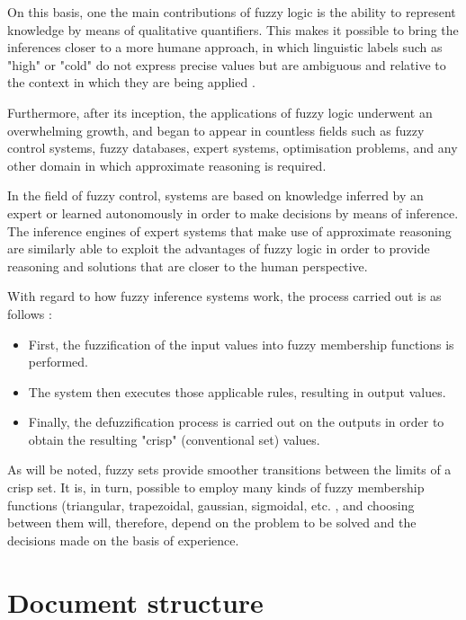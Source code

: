 On this basis, one the main contributions of fuzzy logic is the ability to represent knowledge by means of qualitative quantifiers. This makes it possible to bring the inferences closer to a more humane approach, in which linguistic labels such as "high" or "cold" do not express precise values but are ambiguous and relative to the context in which they are being applied \cite{morcillo_tecnicas_nodate, zadeh_concept_1975, bellman_decision-making_1970}.

Furthermore, after its inception, the applications of fuzzy logic underwent an overwhelming growth, and began to appear in countless fields such as fuzzy control systems, fuzzy databases, expert systems, optimisation problems, and any other domain in which approximate reasoning is required.

In the field of fuzzy control, systems are based on knowledge inferred by an expert or learned autonomously in order to make decisions by means of inference. The inference engines of expert systems that make use of approximate reasoning are similarly able to exploit the advantages of fuzzy logic in order to provide reasoning and solutions that are closer to the human perspective.

With regard to how fuzzy inference systems work, the process carried out is as follows \cite{wikipedia_fuzzy_2020}:

\begin{itemize}
\item First, the fuzzification of the input values into fuzzy membership functions is performed.
\item The system then executes those applicable rules, resulting in output values.
\item Finally, the defuzzification process is carried out on the outputs in order to obtain the resulting "crisp" (conventional set) values.
\end{itemize}

As will be noted, fuzzy sets provide smoother transitions between the limits of a crisp set. It is, in turn, possible to employ many kinds of fuzzy membership functions (triangular, trapezoidal, gaussian, sigmoidal, etc. \cite{emathteacher_nodate}, and choosing between them will, therefore, depend on the problem to be solved and the decisions made on the basis of experience.

\section{Document structure}

